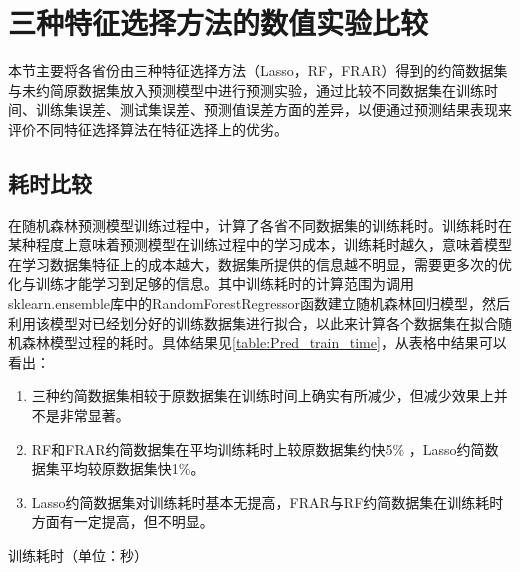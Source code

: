 \section{三种特征选择方法的数值实验比较}
本节主要将各省份由三种特征选择方法（Lasso，RF，FRAR）得到的约简数据集与未约简原数据集放入预测模型中进行预测实验，通过比较不同数据集在训练时间、训练集误差、测试集误差、预测值误差方面的差异，以便通过预测结果表现来评价不同特征选择算法在特征选择上的优劣。

\subsection{耗时比较}
在随机森林预测模型训练过程中，计算了各省不同数据集的训练耗时。训练耗时在某种程度上意味着预测模型在训练过程中的学习成本，训练耗时越久，意味着模型在学习数据集特征上的成本越大，数据集所提供的信息越不明显，需要更多次的优化与训练才能学习到足够的信息。其中训练耗时的计算范围为调用sklearn.ensemble库中的RandomForestRegressor函数建立随机森林回归模型，然后利用该模型对已经划分好的训练数据集进行拟合，以此来计算各个数据集在拟合随机森林模型过程的耗时。具体结果见\ref{table:Pred_train_time}，从表格中结果可以看出：
\begin{enumerate}
\item 三种约简数据集相较于原数据集在训练时间上确实有所减少，但减少效果上并不是非常显著。
\item RF和FRAR约简数据集在平均训练耗时上较原数据集约快5\% ，Lasso约简数据集平均较原数据集快1\%。
\item Lasso约简数据集对训练耗时基本无提高，FRAR与RF约简数据集在训练耗时方面有一定提高，但不明显。
\end{enumerate}
\begin{table}[htbp]
      \centering
      \caption{训练耗时（单位：秒）}
      \label{table:Pred_train_time}
\end{table}
